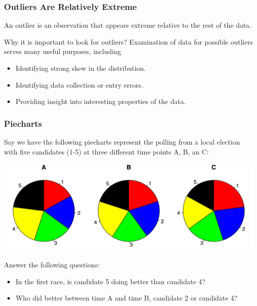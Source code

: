 \documentclass[handout]{beamer}
\newcommand{\blue}[1]{\textcolor{blue2}{#1}}
\begin{document}
\begin{frame}
\frametitle{Outliers Are Relatively Extreme}
An \blue{outlier} is an observation that appears extreme relative to the rest of the data.

\vspace{0.5cm}

\pause Why it is important to look for outliers?  Examination of data for possible outliers serves many useful purposes, including
\begin{itemize}
\pause\item Identifying strong skew in the distribution.
\pause\item Identifying data collection or entry errors.
\pause\item Providing insight into interesting properties of the data.
\end{itemize}

\end{frame}


\begin{frame}[fragile]
\frametitle{Piecharts}
Say we have the following piecharts represent the polling from a local election with five candidates (1-5) at three different time points A, B, an C:

\pause\begin{center}
\includegraphics[width=\textwidth]{figure/piecharts.png}
\end{center}

\pause Answer the following questions:
\begin{itemize}
\item In the first race, is candidate 5 doing better than candidate 4?
\item Who did better between time A and time B, candidate 2 or candidate 4?
\end{itemize}

\end{frame}
\end{document}
